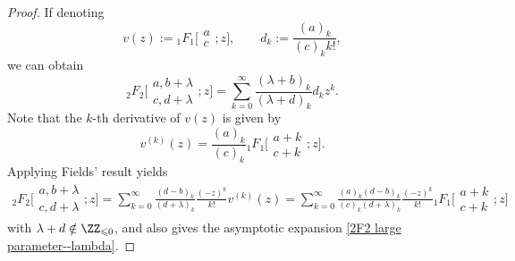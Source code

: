 \begin{proof}
	If denoting
	\[v(z):={}_1F_1\biggl[\begin{matrix}
		a\\
		c
	\end{matrix};z\biggr],\qquad d_k:=\frac{(a)_k}{(c)_k k!},\]
	we can obtain
	\[{}_2F_2\biggl[\begin{matrix}
		a,b+\lambda\\
		c,d+\lambda
	\end{matrix};z\biggr]=\sum_{k=0}^{\infty}\frac{ (\lambda+b )_k}{ (\lambda+d )_k}d_k z^k.\]
	Note that the $k$-th derivative of $v(z)$ is given by \cite[p.~405, equation~(16.3.1)]{NIST-Handbook}
	\[v^{(k)}(z)=\frac{(a)_k}{(c)_k}
	{}_1F_1\biggl[\begin{matrix}
		a+k\\
		c+k
	\end{matrix};z\biggr].\]
	Applying Fields' result \cite[Theorem 3]{Fields-1967} yields
	\begin{gather}\label{2F2 transformation}
		{}_2F_2\biggl[\begin{matrix}
			a,b+\lambda\\
			c,d+\lambda
		\end{matrix};z\biggr]=\sum_{k=0}^{\infty}\frac{(d-b)_k}{(d+\lambda)_k}\frac{(-z)^k}{k!}v^{(k)}(z)=\sum_{k=0}^{\infty}\frac{(a)_k(d-b)_k}{(c)_k(d+\lambda)_k}\frac{(-z)^k}{k!}{}_1F_1\biggl[\begin{matrix}
			a+k\\
			c+k
		\end{matrix};z\biggr]
	\end{gather}
	with $\lambda+d\notin\ZZ_{\leqslant 0}$, and also gives the asymptotic expansion \eqref{2F2 large parameter--lambda}.
\end{proof}

